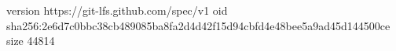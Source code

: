 version https://git-lfs.github.com/spec/v1
oid sha256:2e6d7c0bbc38cb489085ba8fa2d4d42f15d94cbfd4e48bee5a9ad45d144500ce
size 44814
